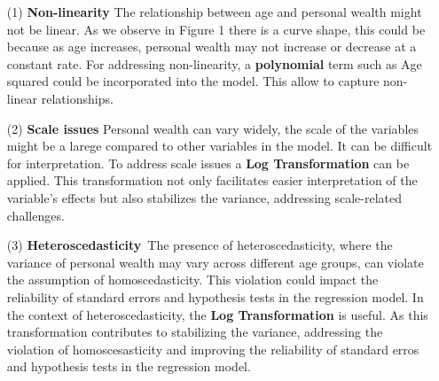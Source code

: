 \documentclass[12pt,letterpaper]{article}
\begin{document}
\begin{enumerate}
	
	\item [(1)] \textbf{Non-linearity}\: The relationship between age and personal wealth might not be linear. As we observe in Figure 1 there is a curve shape, this could be because as age increases, personal wealth may not increase or decrease at a constant rate. For addressing non-linearity, a \textbf{polynomial} term such as Age squared could be incorporated into the model. This allow to capture non-linear relationships. 
	\item [(2)] \textbf{Scale issues}\: Personal wealth can vary widely, the scale of the variables might be a larege compared to other variables in the model. It can be difficult for interpretation. To address scale issues a \textbf{Log Transformation} can be applied. This transformation not only facilitates easier interpretation of the variable's effects but also stabilizes the variance, addressing scale-related challenges.  
	\item [(3)] \textbf{Heteroscedasticity}\ The presence of heteroscedasticity, where the variance of personal wealth may vary across different age groups, can violate the assumption of homoscedasticity. This violation could impact the reliability of standard errors and hypothesis tests in the regression model. In the context of heteroscedasticity, the \textbf{Log Transformation} is useful. As this transformation contributes to stabilizing the variance, addressing the violation of homoscesasticity and improving the reliability of standard erros and hypothesis tests in the regression model. 

	
\end{enumerate}
\end{document}
